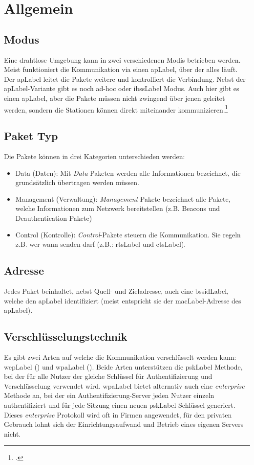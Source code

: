 \chapter{Allgemein}

\section{Modus}
Eine drahtlose Umgebung kann in zwei verschiedenen Modis betrieben werden.
Meist funktioniert die Kommunikation via einen \gls{apLabel}, über der alles läuft. Der \gls{apLabel} leitet die Pakete weitere und kontrolliert die Verbindung.
Nebst der \gls{apLabel}-Variante gibt es noch ad-hoc oder \gls{ibssLabel} Modus. Auch hier gibt es einen \gls{apLabel}, aber die Pakete müssen nicht zwingend über jenen geleitet werden, sondern die Stationen können direkt miteinander kommunizieren.\footcite[][38]{WrightCache201503}

\section{Paket Typ}
Die Pakete können in drei Kategorien unterschieden werden:
\begin{itemize}
	\item Data (Daten): Mit \textit{Data}-Paketen werden alle Informationen bezeichnet, die grundsätzlich übertragen werden müssen.
	\item Management (Verwaltung): \textit{Management} Pakete bezeichnet alle Pakete, welche Informationen zum Netzwerk bereitstellen (z.B. Beacons und Deauthentication Pakete)
	\item Control (Kontrolle): \textit{Control}-Pakete steuern die Kommunikation. Sie regeln z.B. wer wann senden darf (z.B.: \gls{rtsLabel} und \gls{ctsLabel}).
\end{itemize}

\section{Adresse}
Jedes Paket beinhaltet, nebst Quell- und Zieladresse, auch eine \gls{bssidLabel}, welche den \gls{apLabel} identifiziert (meist entspricht sie der \gls{macLabel}-Adresse des \gls{apLabel}).


\section{Verschlüsselungstechnik}
Es gibt zwei Arten auf welche die Kommunikation verschlüsselt werden kann: \gls{wepLabel} () und \gls{wpaLabel} ().
Beide Arten unterstützen die \gls{pskLabel} Methode, bei der für alle Nutzer der gleiche Schlüssel für Authentifizierung und Verschlüsselung verwendet wird.
\gls{wpaLabel} bietet alternativ auch eine \textit{enterprise} Methode an, bei der ein Authentifizierung-Server jeden Nutzer einzeln authentifiziert und für jede Sitzung einen neuen \gls{pskLabel} Schlüssel generiert. Dieses \textit{enterprise} Protokoll wird oft in Firmen angewendet, für den privaten Gebrauch lohnt sich der Einrichtungsaufwand und Betrieb eines eigenen Servers nicht.

